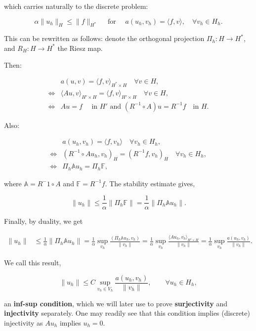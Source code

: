 \documentclass{article}
\begin{document}
which carries naturally to the discrete problem:

\[\alpha \|u_h\|_H \leq \|f\|_{H^*}\quad\text{ for }\quad a(u_h,v_h) = \langle f, v\rangle, \quad \forall v_h\in H_h.\]

This can be rewritten as follows: denote the orthogonal projection $\Pi_h: H\to H^*$, and $R_H:H\to H^*$ the Riesz map.

Then:

\begin{align*}
    &a(u,v) = \langle f, v\rangle_{H^*\times H}\quad \forall v\in H,\\
    \iff &\langle Au, v\rangle_{H'\times H} = \langle f, v\rangle_{H'\times H}\quad \forall v\in H,\\
    \iff &Au = f \quad\text{ in $H'$ and }(R^{-1}\circ A)u = R^{-1}f\quad\text{in }H.
\end{align*}

Also:

\begin{align*}
    &a(u_h,v_h) = \langle f, v_h\rangle\quad\forall v_h\in H_h,\\
    \iff &(R^{-1}\circ A u_h,v_h)_H = (R^{-1}f,v_h)_H\quad\forall v_h\in H_h,\\
    \iff &\Pi_h\mathbb{A}u_h = \Pi_h\mathbb{F},
\end{align*}

where $\mathbb{A} = R^-1\circ A$ and $\mathbb{F} = R^{-1}f$. The stability estimate gives, 

\[\|u_h\| \leq\frac{1}{\alpha}\|\Pi_h\mathbb{F}\| = \frac{1}{\alpha}\|\Pi_h\mathbb{A} u_h\|.\]

Finally, by duality, we get

\begin{align*}
    \|u_h\| &\leq \frac{1}{\alpha}\|\Pi_h\mathbb{A}u_h\| = \frac{1}{\alpha}\sup_{v_h}\frac{(\Pi_h\mathbb{A}u_h,v_h)}{\|v_h\|}
    =\frac{1}{\alpha}\sup_{v_h}\frac{\langle Au_h,v_h\rangle_{H'\times H}}{\|v_h\|} = \frac{1}{\alpha}\sup_{v_h}\frac{a(u_h,v_h)}{\|v_h\|}.
\end{align*}

We call this result,

\[\|u_h\| \leq C\sup_{v_h\in V_h}\frac{a(u_h,v_h)}{\|v_h\|},\qquad \forall u_h\in H_h,\]

an \textbf{inf-sup condition}, which we will later use to prove \textbf{surjectivity} and \textbf{injectivity} separately. One may readily see that this condition implies (discrete) injectivity as $Au_h$ implies $u_h = 0$.
\end{document}
